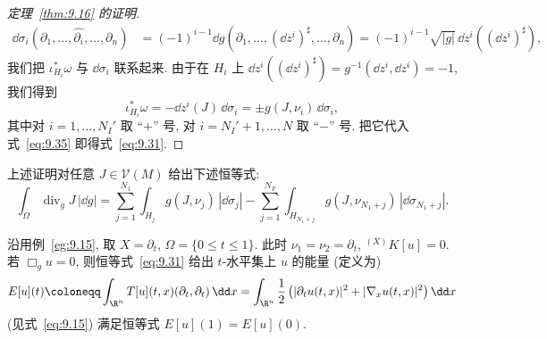 \begin{proof}[定理~\ref{thm:9.16} 的证明]
\begin{equation}
\begin{aligned}
        \dd \sigma_i(\partial_1, \ldots, \widehat{\partial_i}, \ldots, \partial_n) &= (-1)^{i-1} \dd g(\partial_1, \ldots, (\dd z^i)^\sharp, \ldots, \partial_n) = (-1)^{i-1} \sqrt{|g|} \, \dd z^i((\dd z^i)^\sharp),
    \end{aligned}
\end{equation}
我们把 $\iota_{H_i}^* \omega$ 与 $\dd \sigma_i$ 联系起来. 由于在 $H_i$ 上 $\dd z^i((\dd z^i)^\sharp) = g^{-1}(\dd z^i, \dd z^i) = -1$, 我们得到
\begin{equation}\label{eq:9.37}
    \iota_{H_i}^* \omega = -\dd z^i(J) \, \dd \sigma_i = \pm g(J, \nu_i) \, \dd \sigma_i,
\end{equation}
其中对 $i = 1, \ldots, N_I'$ 取 ``$+$'' 号, 对 $i = N_I' + 1, \ldots, N$ 取 ``$-$'' 号. 把它代入式~\eqref{eq:9.35} 即得式~\eqref{eq:9.31}.
\end{proof}

上述证明对任意 $J \in \mathcal{V}(M)$ 给出下述恒等式:
\begin{equation}\label{eq:9.38}
    \int_{\Omega} \operatorname{div}_g J \, |\dd g| = \sum_{j=1}^{N_1} \int_{H_j} g(J, \nu_j) \, |\dd \sigma_j| - \sum_{j=1}^{N_F} \int_{H_{N_1+j}} g(J, \nu_{N_1+j}) \, |\dd \sigma_{N_1+j}|.
\end{equation}

\begin{example}\label{eg:9.17}
沿用例~\ref{eg:9.15}, 取 $X = \partial_t$, $\Omega = \{0 \le t \le 1\}$. 此时 $\nu_1 = \nu_2 = \partial_t$, ${}^{(X)} K[u] = 0$. 若 $\Box_g u = 0$, 则恒等式~\eqref{eq:9.31} 给出 $t$-水平集上 $u$ 的能量 (定义为)
\begin{equation}\label{eq:9.39}
    E[u](t) \defeq \int_{\R^n} T[u](t, x)(\partial_t, \partial_t) \, \dd x = \int_{\R^n} \frac12 \left( |\partial_t u(t, x)|^2 + |\nabla_x u(t, x)|^2 \right) \dd x
\end{equation}
(见式~\eqref{eq:9.15}) 满足恒等式 $E[u](1) = E[u](0)$.
\end{example}

